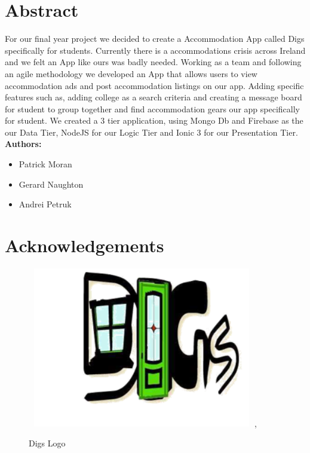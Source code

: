 
\chapter*{Abstract}

For our final year project we decided to create a Accommodation App called Digs specifically for students. Currently there is a accommodations crisis across Ireland and we felt an App like ours was badly needed. Working as a team and following an agile methodology we developed an App that allows users to view accommodation ads and post accommodation listings on our app. Adding specific features such as, adding college as a search criteria and creating a message board for student to group together and find accommodation gears our app specifically for student. We created a 3 tier application, using Mongo Db and Firebase as the our Data Tier, NodeJS for our Logic Tier and Ionic 3 for our Presentation Tier.\\

\noindent \textbf{Authors:}

\begin{itemize}
    \item Patrick Moran
    \item Gerard Naughton
    \item Andrei Petruk
\end{itemize}

\chapter*{\centering Acknowledgements}

\begin{figure}[h]
\centering
\includegraphics[width=10cm, height=7cm]{img/digs.png},
\caption{Digs Logo}
\label{digs_logo}
\end{figure}


